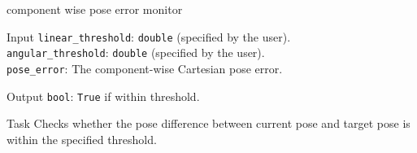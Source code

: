 \begin{frame}{component wise pose error monitor}
\begin{alertblock}{Input}
\texttt{linear\_threshold}: \texttt{double} (specified by the user). \\
\texttt{angular\_threshold}: \texttt{double} (specified by the user). \\
\texttt{pose\_error}: The component-wise Cartesian pose error.
\end{alertblock}

\begin{alertblock}{Output}
\texttt{bool}: \texttt{True} if within threshold.
\end{alertblock}

\begin{alertblock}{Task}
Checks whether the pose difference between current pose and target pose is within the specified threshold.
\end{alertblock}
\end{frame}

